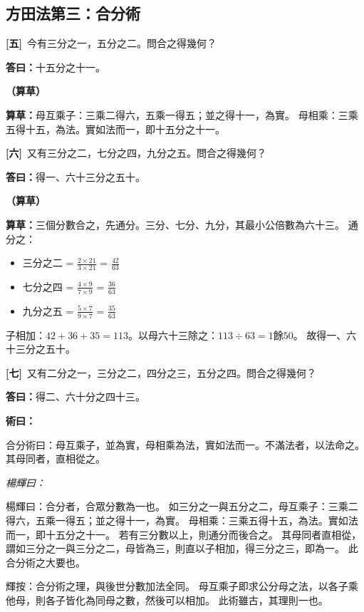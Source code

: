 \documentclass[11pt,a4paper]{article}
\newenvironment{method}{%
  \par\noindent\textcolor{methodcolor}{\textbf{術曰：}}%
  \ignorespaces
}{\par\vspace{0.5em}}
\newenvironment{caocao}{%
  \par\noindent\textcolor{caocaocolor}{\small\textbf{（算草）}}%
  \ignorespaces
}{\par\vspace{0.5em}}
\newenvironment{yanghuicomment}{%
  \par\noindent\textcolor{commentarycolor}{\small\textit{楊輝曰：}}%
  \ignorespaces
}{\par\vspace{0.5em}}
\newcommand{\problemnum}[1]{\textbf{[\ignorespaces#1\unskip]}}
\begin{document}
\subsection{方田法第三：合分術}

\noindent\problemnum{五}\,
今有三分之一，五分之二。問合之得幾何？

\noindent\textcolor{answercolor}{\textbf{答曰：}}十五分之十一。

\begin{caocao}
\textbf{算草：}母互乘子：三乘二得六，五乘一得五；並之得十一，為實。
母相乘：三乘五得十五，為法。實如法而一，即十五分之十一。
\end{caocao}

\noindent\problemnum{六}\,
又有三分之二，七分之四，九分之五。問合之得幾何？

\noindent\textcolor{answercolor}{\textbf{答曰：}}得一、六十三分之五十。

\begin{caocao}
\textbf{算草：}三個分數合之，先通分。三分、七分、九分，其最小公倍數為六十三。
通分之：
\begin{itemize}[leftmargin=3em]
\item 三分之二 = $\frac{2 \times 21}{3 \times 21}$ = $\frac{42}{63}$
\item 七分之四 = $\frac{4 \times 9}{7 \times 9}$ = $\frac{36}{63}$
\item 九分之五 = $\frac{5 \times 7}{9 \times 7}$ = $\frac{35}{63}$
\end{itemize}
子相加：$42 + 36 + 35 = 113$。以母六十三除之：$113 \div 63 = 1$餘$50$。
故得一、六十三分之五十。
\end{caocao}

\noindent\problemnum{七}\,
又有二分之一，三分之二，四分之三，五分之四。問合之得幾何？

\noindent\textcolor{answercolor}{\textbf{答曰：}}得二、六十分之四十三。

\begin{method}
合分術曰：母互乘子，並為實，母相乘為法，實如法而一。不滿法者，以法命之。其母同者，直相從之。
\end{method}

\begin{yanghuicomment}
楊輝曰：合分者，合眾分數為一也。
如三分之一與五分之二，母互乘子：三乘二得六，五乘一得五；並之得十一，為實。
母相乘：三乘五得十五，為法。實如法而一，即十五分之十一。
若有三分數以上，則通分而後合之。
其母同者直相從，謂如三分之一與三分之二，母皆為三，則直以子相加，得三分之三，即為一。
此合分術之大要也。

輝按：合分術之理，與後世分數加法全同。
母互乘子即求公分母之法，以各子乘他母，則各子皆化為同母之數，然後可以相加。
此術雖古，其理則一也。
\end{yanghuicomment}
\end{document}
